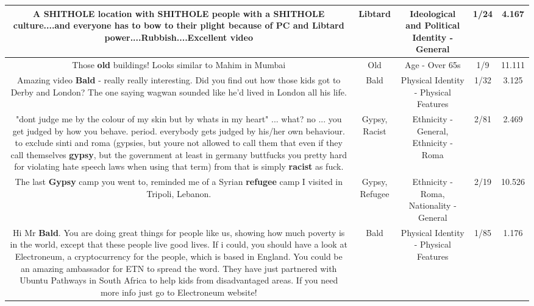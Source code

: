 \documentclass[11pt]{article}
\newlength\mylength
\begin{document}
\begin{center}
\begin{longtable}{|C{.65\mylength}|C{.30\mylength}|C{.12\mylength}|C{.12\mylength}|C{.12\mylength}|}
  \small A SHITHOLE location with SHITHOLE people with a SHITHOLE culture....and everyone has to bow to their plight because of PC and \textbf{Libtard} power....Rubbish....Excellent video\normalsize   & Libtard &  Ideological and Political Identity - General & 1/24 & 4.167 \\  \hline
  \small Those \textbf{old} buildings! Looks similar to Mahim in Mumbai\normalsize   & Old & Age - Over 65s & 1/9 & 11.111 \\  \hline
  \small Amazing video \textbf{Bald} - really really interesting. Did you find out how those kids got to Derby and London? The one saying wagwan sounded like he'd lived in London all his life.\normalsize   & Bald & Physical Identity - Physical Features & 1/32 & 3.125 \\  \hline
  \small "dont judge me by the colour of my skin but by whats in my heart" ... what? no ... you get judged by how you behave. period. everybody gets judged by his/her own behaviour. to exclude sinti and roma (gypsies, but youre not allowed to call them that even if they call themselves \textbf{gypsy}, but the government at least in germany buttfucks you pretty hard for violating hate speech laws when using that term) from that is simply \textbf{racist} as fuck.\normalsize   & Gypsy, Racist & Ethnicity - General, Ethnicity - Roma & 2/81 & 2.469 \\  \hline
  \small The last \textbf{Gypsy} camp you went to, reminded me of a Syrian \textbf{refugee} camp I visited in Tripoli, Lebanon.\normalsize   & Gypsy, Refugee & Ethnicity - Roma, Nationality - General & 2/19 & 10.526 \\  \hline
  \small Hi Mr \textbf{Bald}. You are doing great things for people like us, showing how much poverty is in the world, except that these people live good lives. If i could, you should have a look at Electroneum, a cryptocurrency for the people, which is based in England. You could be an amazing ambassador for ETN to spread the word. They have just partnered with Ubuntu Pathways in South Africa to help kids from disadvantaged areas. If you need more info just go to Electroneum website!\normalsize   & Bald & Physical Identity - Physical Features & 1/85 & 1.176 \\  \hline

\end{longtable}
\end{center}
\end{document}
